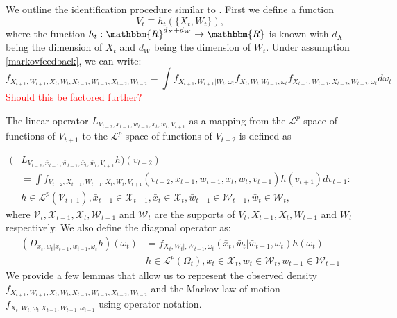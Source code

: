 \documentclass{article}
\begin{document}
We outline the identification procedure similar to \cite{Hu2012}. First we define a function
\begin{equation}\label{dimreduce}
V_{t}\equiv h_{t}(\{X_{t}, W_{t}\}),
\end{equation}
 where the function $h_{t}:\mathbbm{R}^{d_{X}+d_{W}}\rightarrow \mathbbm{R}$ is known with $d_{X}$ being the dimension of $X_{t}$ and $d_{W}$ being the dimension of $W_{t}$. Under assumption \eqref{markovfeedback}, we can write:
 \begin{equation}\label{obsdens}
 f_{X_{t+1}, W_{t+1}, X_{t}, W_{t}, X_{t-1}, W_{t-1}, X_{t-2}, W_{t-2}}=\int f_{X_{t+1},W_{t+1}|W_{t},\omega_{t}}f_{X_{t}, W_{t}|W_{t-1},\omega_{t}}f_{X_{t-1}, W_{t-1}, X_{t-2}, W_{t-2}, \omega_{t}}d\omega_{t}
 \end{equation}
 \textcolor{red}{Should this be factored further?}

The linear operator $L_{V_{t-2},\bar{x}_{t-1},\bar{w}_{t-1},\bar{x}_{t},\bar{w}_{t}, V_{t+1}}$ as a mapping from the $\mathcal{L}^{p}$ space of functions of $V_{t+1}$ to the $\mathcal{L}^{p}$ space of functions of $V_{t-2}$ is defined as

\begin{equation}\label{operator}
    \begin{split}
     (&L_{V_{t-2},\bar{x}_{t-1},\bar{w}_{t-1},\bar{x}_{t},\bar{w}_{t}, V_{t+1}}h)(v_{t-2})\\
     &=\int f_{V_{t-2}, X_{t-1}, W_{t-1}, X_{t}, W_{t}, V_{t+1}}(v_{t-2}, \bar{x}_{t-1}, \bar{w}_{t-1}, \bar{x}_{t}, \bar{w}_{t}, v_{t+1})h(v_{t+1})dv_{t+1}:\\
     &h\in \mathcal{L}^{p}(\mathcal{V}_{t+1}), \bar{x}_{t-1}\in \mathcal{X}_{t-1}, \bar{x}_{t}\in \mathcal{X}_{t}, \bar{w}_{t-1}\in \mathcal{W}_{t-1}, \bar{w}_{t}\in \mathcal{W}_{t},
    \end{split}
\end{equation}
where $\mathcal{V}_{t}, \mathcal{X}_{t-1}, \mathcal{X}_{t}, \mathcal{W}_{t-1}$ and $\mathcal{W}_{t}$ are the supports of $V_{t}, X_{t-1}, X_{t}, W_{t-1}$ and $W_{t}$ respectively. We also define the diagonal operator as:
\begin{equation}\label{diagonal}
    \begin{split}
        (D_{\bar{x}_{t}, \bar{w}_{t}|\bar{x}_{t-1}, \bar{w}_{t-1}, \omega_{t}}h)(\omega_{t})&=f_{X_{t}, W_{t}|, W_{t-1}, \omega_{t}}(\bar{x}_{t}, \bar{w}_{t}|\bar{w}_{t-1}, \omega_{t})h(\omega_{t})\\
        &h\in \mathcal{L}^{p}(\Omega_{t}), \bar{x}_{t}\in \mathcal{X}_{t}, \bar{w}_{t}\in \mathcal{W}_{t}, \bar{w}_{t-1}\in \mathcal{W}_{t-1}
    \end{split}
\end{equation}
We provide a few lemmas that allow us to represent the observed density $f_{X_{t+1}, W_{t+1}, X_{t}, W_{t}, X_{t-1}, W_{t-1}, X_{t-2}, W_{t-2}}$ and the Markov law of motion $f_{X_{t}, W_{t}, \omega_{t}|X_{t-1}, W_{t-1}, \omega_{t-1}}$ using operator notation.
\end{document}
